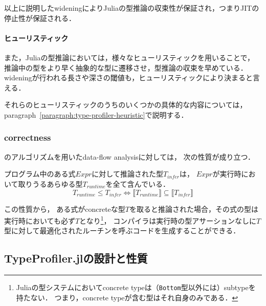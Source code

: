 以上に説明したwideningによりJuliaの型推論の収束性が保証され，つまりJITの停止性が保証される．

\paragraph{ヒューリスティック} \label{paragraph:inference-heuristic}

また，Juliaの型推論においては，様々なヒューリスティックを用いることで，
推論中の型をより早く抽象的な型に遷移させ，型推論の収束を早めている．
wideningが行われる長さや深さの閾値も，ヒューリスティックにより決まると言える．

それらのヒューリスティックのうちのいくつかの具体的な内容については，
paragraph~\ref{paragraph:type-profiler-heuristic}で説明する．

\subsubsection{correctness} \label{subsubsection:inference-correctness}

\cite{graph-free-data-flow-analysis}のアルゴリズムを用いたdata-flow analysisに対しては，
次の性質が成り立つ\cite{jeff-master}．


\begin{theorem*}[correctness]
  \label{theorem:inference-correctness}
  プログラム中のある式\(Expr\)に対して推論された型\(T_{infer}\)は，
  \(Expr\)が実行時において取りうるあらゆる型\(T_{runtime}\)を全て含んでいる．
  \[
    T_{runtime} \leq T_{infer} \Leftrightarrow \llbracket T_{runtime} \rrbracket \subseteq \llbracket T_{infer} \rrbracket
  \]
\end{theorem*}

この性質から，
ある式がconcreteな型\(T\)を取ると推論された場合，その式の型は実行時においても必ず\(T\)となり\footnote{
  Juliaの型システムにおいてconcrete typeは（\texttt{Bottom}型以外には）subtypeを持たない．
  つまり，concrete typeが含む型はそれ自身のみである．
}，
コンパイラは実行時の型アサーションなしに\(T\)型に対して最適化されたルーチンを呼ぶコードを生成することができる．


\subsection{TypeProfiler.jlの設計と性質} \label{subsection:type-profiler-design-and-property}

